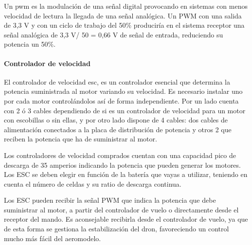  
 Un \acl{pwm} es la modulación de una señal digital provocando en sistemas con menos velocidad de lectura la llegada de una señal analógica. Un PWM con una salida de 3,3 V y con un ciclo de trabajo del 50\% produciría en el sistema receptor una señal analógica de 3,3 V/ 50 = 0,66 V de señal de entrada, reduciendo su potencia un 50\%.

 
 \paragraph{Controlador de velocidad}
 \label{SSS:Controlador de velocidad}
 


 El controlador de velocidad \acl{esc}, es un controlador esencial que determina la potencia suministrada al motor variando su velocidad. Es necesario instalar uno por cada motor controlándolos así de forma independiente.
 Por un lado cuenta con 2 ó 3 cables dependiendo de si es un controlador de velocidad para un motor con escobillas o sin ellas, y por otro lado dispone de 4 cables: dos cables de alimentación conectados a la placa de distribución de potencia y otros 2 que reciben la potencia que ha de suministrar al motor.
 
 
 Los controladores de velocidad comprados cuentan con una capacidad pico de descarga de 35 amperios indicando la potencia que pueden generar los motores. Los ESC se deben elegir en función de la batería que vayas a utilizar, teniendo en cuenta el número de celdas y su ratio de descarga continua.
 
 Los ESC pueden recibir la señal PWM que indica la potencia que debe suministrar al motor, a partir del controlador de vuelo o directamente desde el receptor del mando. Es aconsejable recibirla desde el controlador de vuelo, ya que de esta forma se gestiona la estabilización del dron, favoreciendo un control mucho más fácil del aeromodelo. \cite{OscarSerrano}

